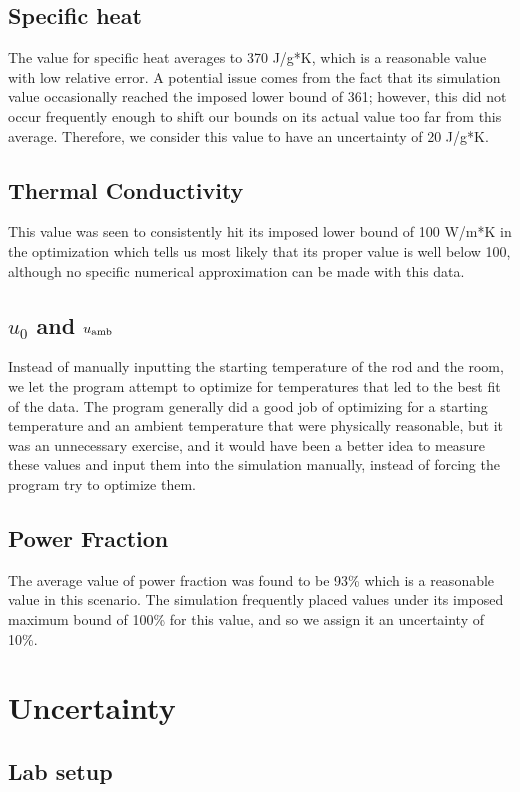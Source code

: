 \documentclass[letterpaper,titlepage,oneside]{report}
\begin{document}
\subsection* {Specific heat}
The value for specific heat averages to 370 J/g*K,
which is a reasonable value with low relative error.
A potential issue comes from the fact that its simulation value
occasionally reached the imposed lower bound of 361; however,
this did not occur frequently enough to shift our bounds on
its actual value too far from this average.
Therefore, we consider this value to have an uncertainty of 20 J/g*K.

\subsection* {Thermal Conductivity}
This value was seen to consistently hit its imposed lower bound of
100 W/m*K in the optimization which tells us most likely that
its proper value is well below 100, although no specific
numerical approximation can be made with this data.

\subsection* {$u_0$ and $u_{\rm{amb}}$}
Instead of manually inputting the starting temperature of the rod
and the room, we let the program attempt to optimize for temperatures
that led to the best fit of the data. The program generally did a
good job of optimizing for a starting temperature and an ambient
temperature that were physically reasonable, but it was an
unnecessary exercise, and it would have been
a better idea to measure these values and input them into the
simulation manually, instead of forcing the program try to
optimize them.

\subsection* {Power Fraction}
The average value of power fraction was found to be 93\% which
is a reasonable value in this scenario. The simulation frequently
placed values under its imposed maximum bound of 100\% for this
value, and so we assign it an uncertainty of 10\%.

\section{Uncertainty}

\subsection*{Lab setup}
\end{document}
